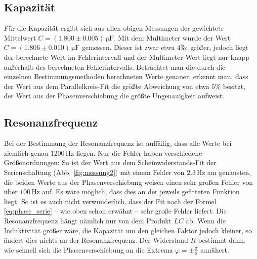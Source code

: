 \documentclass[12pt,a4paper,titlepage,headinclude,bibtotoc]{scrartcl}
\begin{document}
\subsection{Kapazität}
Für die Kapazität ergibt sich aus allen obigen Messungen  der gewichtete Mittelwert $C=(1.800 \pm 0.005)\,\si{\micro\farad}$.
Mit dem Multimeter wurde der Wert $C=(1.806 \pm 0.010)\,\si{\micro\farad}$ gemessen.
Dieser ist zwar etwa $4\permil$ größer, jedoch liegt der berechnete Wert im Fehlerintervall und der Multimeter-Wert liegt nur knapp außerhalb des berechneten Fehlerintervalls.
Betrachtet man die durch die einzelnen Bestimmungsmethoden berechneten Werte genauer, erkennt man, dass der Wert aus dem Parallelkreis-Fit die größte Abweichung von etwa $5\%$ besitzt, der Wert aus der Phasenverschiebung die größte Ungenauigkeit aufweist.

\subsection{Resonanzfrequenz}
Bei der Bestimmung der Resonanzfrequenz ist auffällig, dass alle Werte bei ziemlich genau $1200\,$Hz liegen.
Nur die Fehler haben verschiedene Größenordnungen:
So ist der Wert aus dem Scheinwiderstands-Fit der Serienschaltung (Abb. \ref{fig:messung2}) mit einem Fehler von $2.3\,$Hz am genausten, die beiden Werte aus der Phasenverschiebung weisen einen sehr großen Fehler von über $100\,$Hz auf.
Es wäre möglich, dass dies an der jeweils gefitteten Funktion liegt.
So ist es auch nicht verwunderlich, dass der Fit nach der Formel \eqref{eq:phase_serie} -- wie oben schon erwähnt -- sehr große Fehler liefert:
Die Resonanzfrequenz hängt nämlich nur von dem Produkt $LC$ ab.
Wenn die Induktivität größer wäre, die Kapazität um den gleichen Faktor jedoch kleiner,  so ändert dies nichts an der Resonanzfrequenz.
Der Widerstand $R$ bestimmt dann, wie schnell sich die Phasenverschiebung an die Extrema $\varphi=\pm\frac{\pi}{2}$ annähert.



\end{document}
